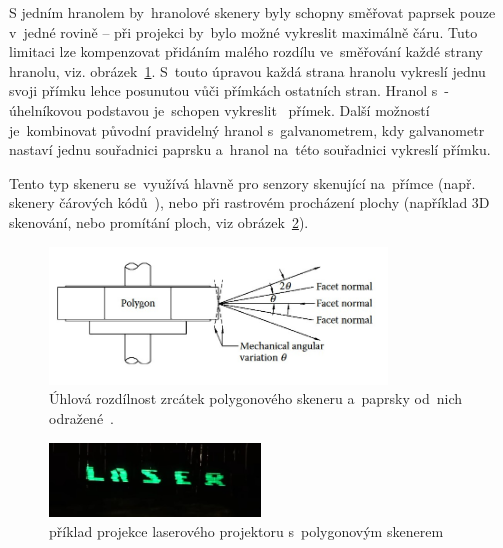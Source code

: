 
%

S jedním hranolem by~hranolové skenery byly schopny směřovat paprsek pouze v~jedné rovině -- při projekci by~bylo možné vykreslit maximálně čáru. Tuto limitaci lze kompenzovat přidáním malého rozdílu ve~směřování každé strany hranolu, viz. obrázek~\ref{fig:polygon-angular-variation}. S~touto úpravou každá strana hranolu vykreslí jednu svoji přímku lehce posunutou vůči přímkách ostatních stran. Hranol s~-úhelníkovou podstavou je~schopen vykreslit ~přímek.
Další možností je~kombinovat původní pravidelný hranol s~galvanometrem, kdy galvanometr nastaví jednu souřadnici paprsku a~hranol na~této souřadnici vykreslí přímku.

Tento typ skeneru se~využívá hlavně pro senzory skenující na~přímce (např. skenery čárových kódů~\cite{history-of-barcode-scanning}), nebo při rastrovém procházení plochy (například 3D skenování, nebo promítání ploch, viz obrázek~\ref{fig:harddrive-projection}).

\begin{figure}[H]
  \centering
  \includegraphics[width=0.8\textwidth]{img/polygon-angular-variation.jpg}
  \caption{\label{fig:polygon-angular-variation} Úhlová rozdílnost zrcátek polygonového skeneru a~paprsky od~nich odražené~\cite{scanning-handbook}.}
\end{figure}


\begin{figure}[H]
  \centering
  \includegraphics[width=0.5\textwidth]{img/harddrive-projection.jpg}
  \caption{\label{fig:harddrive-projection} příklad projekce laserového projektoru s~polygonovým skenerem~\cite{harddrive-projector-youtube}}
\end{figure}

